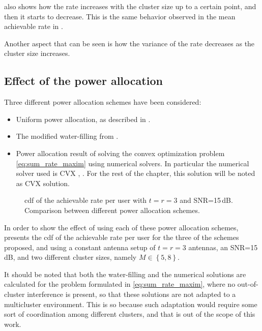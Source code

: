  also shows how the rate increases with the cluster
size up to a certain point, and then it starts to decrease. This is the same
behavior observed in the mean achievable rate in .

Another aspect that can be seen is how the variance of the rate decreases as the
cluster size increases.

\subsection{Effect of the power allocation}\label{ssec:stats_power_alloc}

Three different power allocation schemes have been considered:

\begin{itemize}
   \item Uniform power allocation, as described in
      .
   \item The modified water-filling from .
   \item Power allocation result of solving the convex optimization
      problem \eqref{eq:sum_rate_maxim} using numerical solvers. In particular
      the numerical solver used is CVX \cite{cvx}, \cite{gb08}. For the rest of
      the chapter, this solution will be noted as CVX solution.
\end{itemize}

\begin{figure}[t]
\begin{center}
    \hspace*{1mm}
\end{center}
\caption{\gls{cdf} of the achievable rate per user with $t=r=3$ and SNR=15\,dB.
Comparison between different power allocation schemes.}
\label{fig:cdf_power_alloc}
\end{figure}

In order to show the effect of using each of these power allocation schemes,
 presents the \gls{cdf} of the achievable rate per
user for the three of the schemes proposed, and using a constant antenna setup
of $t = r = 3$ antennas, an SNR=15\,dB, and two different cluster sizes, namely
$M \in \left\{5, 8\right\}$.

It should be noted that both the water-filling and the numerical solutions are
calculated for the problem formulated in \eqref{eq:sum_rate_maxim}, where no
out-of-cluster interference is present, so that these solutions are not adapted
to a multicluster environment. This is so because such adaptation would require
some sort of coordination among different clusters, and that is out of the scope
of this work.

